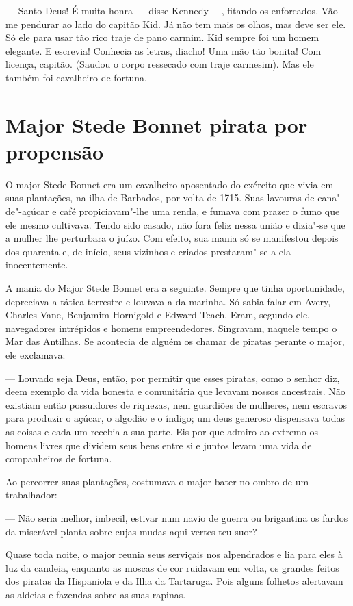 --- Santo Deus! É muita honra --- disse Kennedy ---, fitando os enforcados. Vão me
pendurar ao lado do capitão Kid. Já não tem mais os olhos, mas deve ser
ele. Só ele para usar tão rico traje de pano carmim. Kid sempre foi um
homem elegante. E escrevia! Conhecia as letras, diacho! Uma mão tão
bonita! Com licença, capitão. (Saudou o corpo ressecado com traje
carmesim). Mas ele também foi cavalheiro de fortuna.

\chapter{Major Stede Bonnet pirata por propensão}

O major Stede Bonnet era um cavalheiro aposentado do exército que vivia em
suas plantações, na ilha de Barbados, por volta de 1715. Suas lavouras de
cana"-de"-açúcar e café propiciavam"-lhe uma renda, e fumava com prazer o
fumo que ele mesmo cultivava. Tendo sido casado, não fora feliz nessa
união e dizia"-se que a mulher lhe perturbara o juízo. Com efeito, sua
mania só se manifestou depois dos quarenta e, de início, seus vizinhos e
criados prestaram"-se a ela inocentemente.

A mania do Major Stede Bonnet era a seguinte. Sempre que tinha
oportunidade, depreciava a tática terrestre e louvava a da marinha. Só
sabia falar em Avery, Charles Vane, Benjamim Hornigold e Edward Teach.
Eram, segundo ele, navegadores intrépidos e homens empreendedores.
Singravam, naquele tempo o Mar das Antilhas. Se acontecia de alguém os
chamar de piratas perante o major, ele exclamava:

--- Louvado seja Deus, então, por permitir que esses piratas, como o senhor
diz, deem exemplo da vida honesta e comunitária que levavam nossos
ancestrais. Não existiam então possuidores de riquezas, nem guardiões de
mulheres, nem escravos para produzir o açúcar, o algodão e o índigo; um
deus generoso dispensava todas as coisas e cada um recebia a sua parte.
Eis por que admiro ao extremo os homens livres que dividem seus bens entre
si e juntos levam uma vida de companheiros de fortuna.

Ao percorrer suas plantações, costumava o major bater no ombro de um
trabalhador:

--- Não seria melhor, imbecil, estivar num navio de guerra ou brigantina os
fardos da miserável planta sobre cujas mudas aqui vertes teu suor?

Quase toda noite, o major reunia seus serviçais nos alpendrados e lia para
eles à luz da candeia, enquanto as moscas de cor ruidavam em volta, os
grandes feitos dos piratas da Hispaniola e da Ilha da Tartaruga. Pois
alguns folhetos alertavam as aldeias e fazendas sobre as suas rapinas. 


